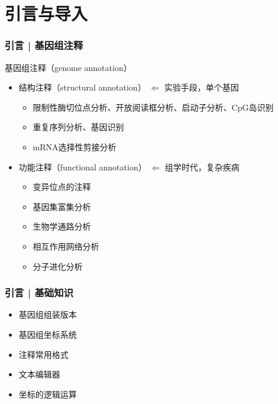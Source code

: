 \documentclass[table]{beamer}
\begin{document}
\section{引言与导入}
\begin{frame}
  \frametitle{引言 | 基因组注释}
  \begin{block}{基因组注释（genome annotation）}
    \begin{itemize}
      \item 结构注释（structural annotation） $\Leftarrow$ 实验手段，单个基因
      \begin{itemize}
        \item 限制性酶切位点分析、开放阅读框分析、启动子分析、CpG岛识别
        \item 重复序列分析、基因识别
        \item mRNA选择性剪接分析
      \end{itemize}
      \item 功能注释（functional annotation） $\Leftarrow$ 组学时代，复杂疾病
      \begin{itemize}
        \item 变异位点的注释
        \item 基因集富集分析
        \item 生物学通路分析
        \item 相互作用网络分析
        \item 分子进化分析
      \end{itemize}
    \end{itemize}
  \end{block}
\end{frame}

\begin{frame}
  \frametitle{引言 | 基础知识}
  \begin{itemize}
    \item 基因组组装版本
    \item 基因组坐标系统
    \item 注释常用格式
    \item 文本编辑器
    \item 坐标的逻辑运算
  \end{itemize}
\end{frame}
\end{document}
